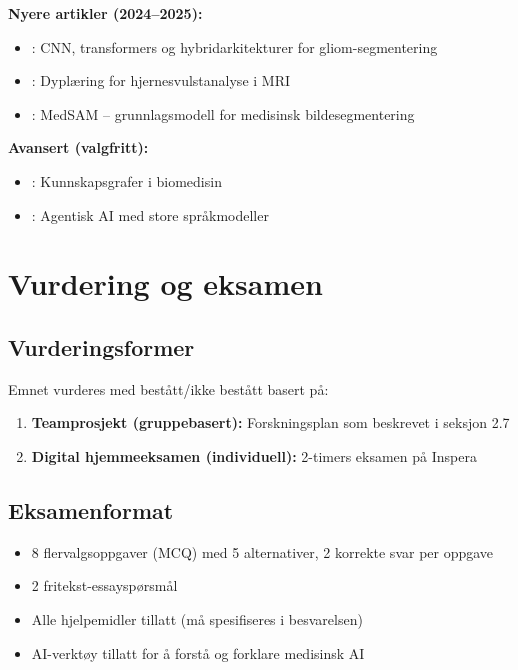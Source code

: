 \documentclass[11pt,a4paper]{article}
\begin{document}
\textbf{Nyere artikler (2024--2025):}
\begin{itemize}[nosep]
    \item \citet{ghadimi2025deep}: CNN, transformers og hybridarkitekturer for gliom-segmentering
    \item \citet{booth2025review}: Dyplæring for hjernesvulstanalyse i MRI
    \item \citet{ma2024medsam}: MedSAM -- grunnlagsmodell for medisinsk bildesegmentering
\end{itemize}

\textbf{Avansert (valgfritt):}
\begin{itemize}[nosep]
    \item \citet{nicholson2020knowledge}: Kunnskapsgrafer i biomedisin
    \item \citet{xi2023rise}: Agentisk AI med store språkmodeller
\end{itemize}

\section{Vurdering og eksamen}

\subsection{Vurderingsformer}

Emnet vurderes med bestått/ikke bestått basert på:

\begin{enumerate}
    \item \textbf{Teamprosjekt (gruppebasert):} Forskningsplan som beskrevet i seksjon 2.7
    \item \textbf{Digital hjemmeeksamen (individuell):} 2-timers eksamen på Inspera
\end{enumerate}

\subsection{Eksamenformat}

\begin{itemize}[nosep]
    \item 8 flervalgsoppgaver (MCQ) med 5 alternativer, 2 korrekte svar per oppgave
    \item 2 fritekst-essayspørsmål
    \item Alle hjelpemidler tillatt (må spesifiseres i besvarelsen)
    \item AI-verktøy tillatt for å forstå og forklare medisinsk AI
\end{itemize}
\end{document}
